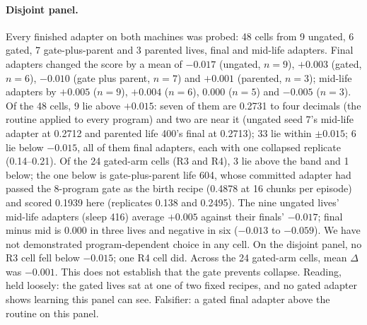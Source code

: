 \documentclass{article}
\begin{document}
\paragraph{Disjoint panel.} Every finished adapter on both machines was probed: 48 cells from 9 ungated, 6 gated, 7 gate-plus-parent and 3 parented lives, final and mid-life adapters. Final adapters changed the score by a mean of $-0.017$ (ungated, $n = 9$), $+0.003$ (gated, $n = 6$), $-0.010$ (gate plus parent, $n = 7$) and $+0.001$ (parented, $n = 3$); mid-life adapters by $+0.005$ ($n = 9$), $+0.004$ ($n = 6$), $0.000$ ($n = 5$) and $-0.005$ ($n = 3$). Of the 48 cells, 9 lie above $+0.015$: seven of them are 0.2731 to four decimals (the routine applied to every program) and two are near it (ungated seed 7's mid-life adapter at 0.2712 and parented life 400's final at 0.2713); 33 lie within $\pm 0.015$; 6 lie below $-0.015$, all of them final adapters, each with one collapsed replicate (0.14--0.21). Of the 24 gated-arm cells (R3 and R4), 3 lie above the band and 1 below; the one below is gate-plus-parent life 604, whose committed adapter had passed the 8-program gate as the birth recipe (0.4878 at 16 chunks per episode) and scored 0.1939 here (replicates 0.138 and 0.2495).
The nine ungated lives' mid-life adapters (sleep 416) average $+0.005$ against their finals' $-0.017$; final minus mid is 0.000 in three lives and negative in six ($-0.013$ to $-0.059$). We have not demonstrated program-dependent choice in any cell. On the disjoint panel, no R3 cell fell below $-0.015$; one R4 cell did. Across the 24 gated-arm cells, mean $\Delta$ was $-0.001$. This does not establish that the gate prevents collapse. Reading, held loosely: the gated lives sat at one of two fixed recipes, and no gated adapter shows learning this panel can see. Falsifier: a gated final adapter above the routine on this panel.

\end{document}
